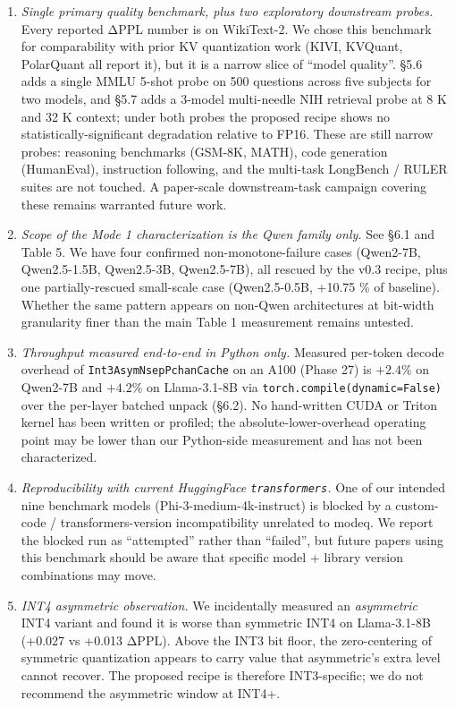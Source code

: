 \begin{enumerate}
\def\labelenumi{\arabic{enumi}.}
\item
  \emph{Single primary quality benchmark, plus two exploratory
  downstream probes.} Every reported ΔPPL number is on WikiText-2. We
  chose this benchmark for comparability with prior KV quantization work
  (KIVI, KVQuant, PolarQuant all report it), but it is a narrow slice of
  ``model quality''. §5.6 adds a single MMLU 5-shot probe on 500
  questions across five subjects for two models, and §5.7 adds a 3-model
  multi-needle NIH retrieval probe at 8 K and 32 K context; under both
  probes the proposed recipe shows no statistically-significant
  degradation relative to FP16. These are still narrow probes: reasoning
  benchmarks (GSM-8K, MATH), code generation (HumanEval), instruction
  following, and the multi-task LongBench / RULER suites are not
  touched. A paper-scale downstream-task campaign covering these remains
  warranted future work.
\item
  \emph{Scope of the Mode 1 characterization is the Qwen family only.}
  See §6.1 and Table 5. We have four confirmed non-monotone-failure
  cases (Qwen2-7B, Qwen2.5-1.5B, Qwen2.5-3B, Qwen2.5-7B), all rescued by
  the v0.3 recipe, plus one partially-rescued small-scale case
  (Qwen2.5-0.5B, +10.75 \% of baseline). Whether the same pattern
  appears on non-Qwen architectures at bit-width granularity finer than
  the main Table 1 measurement remains untested.
\item
  \emph{Throughput measured end-to-end in Python only.} Measured
  per-token decode overhead of \texttt{Int3AsymNsepPchanCache} on an
  A100 (Phase 27) is \(+2.4 \%\) on Qwen2-7B and \(+4.2 \%\) on
  Llama-3.1-8B via \texttt{torch.compile(dynamic=False)} over the
  per-layer batched unpack (§6.2). No hand-written CUDA or Triton kernel
  has been written or profiled; the absolute-lower-overhead operating
  point may be lower than our Python-side measurement and has not been
  characterized.
\item
  \emph{Reproducibility with current HuggingFace \texttt{transformers}.}
  One of our intended nine benchmark models (Phi-3-medium-4k-instruct)
  is blocked by a custom-code / transformers-version incompatibility
  unrelated to modeq. We report the blocked run as ``attempted'' rather
  than ``failed'', but future papers using this benchmark should be
  aware that specific model + library version combinations may move.
\item
  \emph{INT4 asymmetric observation.} We incidentally measured an
  \emph{asymmetric} INT4 variant and found it is worse than symmetric
  INT4 on Llama-3.1-8B (+0.027 vs +0.013 ΔPPL). Above the INT3 bit
  floor, the zero-centering of symmetric quantization appears to carry
  value that asymmetric's extra level cannot recover. The proposed
  recipe is therefore INT3-specific; we do not recommend the asymmetric
  window at INT4+.
\end{enumerate}

